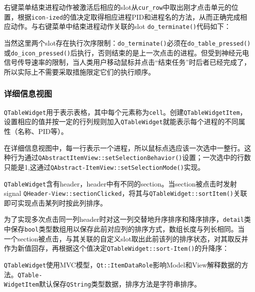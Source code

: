 \documentclass[UTF8,twoside,titlepage]{ctexart}
\newcommand\code[1]{\texttt{#1}}
\begin{document}
右键菜单结束进程动作被激活后相应的slot从\code{cur\_row}中取出刚才点击单元的位置，根据\code{icon-\linebreak ized}的值决定取得相应进程PID和进程名的方法，从而正确完成相应动作。与右键菜单中结束进程动作关联的slot \code{do\_terminate()}代码如下：

{
    \ttfamily
    
}

当然这里两个slot存在执行次序限制：\code{do\_terminate()}必须在\code{do\_table\_pressed()}或\code{do\_icon\_\linebreak pressed()}后执行，否则结束的是上一次点击的进程。但受到神经元电信号传导速率的限制，当人类用户移动鼠标并点击“结束任务”时后者已经完成了，所以实际上不需要采取措施限定它们的执行顺序。

\subsubsection{详细信息视图}
\code{QTableWidget}用于表示表格，其中每个元素称为\code{cell}。创建\code{QTableWidgetItem}，设置相应的值并按一定的行列规则加入\code{QTableWidget}就能表示每个进程的不同属性（名称、PID等）。

在详细信息视图中，每一行表示一个进程，所以鼠标点选应该一次选中一整行。这种行为通过\linebreak\code{QAbstractItemView::setSelectionBehavior()}设置；一次选中的行数只能是1,这通过\code{QAbstract-\linebreak ItemView::setSelectionMode()}实现。

\code{QTableWidget}含有header，header中有不同的section。当section被点击时发射signal \code{QHeader-\linebreak View::sectionClicked}，将其与\code{QTableWidget::sortItem()}关联即可实现点击某列时按此列排序。

为了实现多次点击同一列header时对这一列交替地升序排序和降序排序，\code{detail}类中保存\code{bool}类型数组用以保存此前对应列的排序方式，数组长度与列长相同。当一个section被点击，与其关联的自定义slot取出此前该列的排序状态，对其取反并作为新值回存，再根据这个值决定\code{QTableWidget::sort-\linebreak Item()}的升降序：

{
    \ttfamily
    
}

\code{QTableWidget}使用MVC模型，\code{Qt::ItemDataRole}影响Model和View解释数据的方法。\code{QTable-\\WidgetItem}默认保存\code{QString}类型数据，排序方法是字符串排序。
\end{document}
